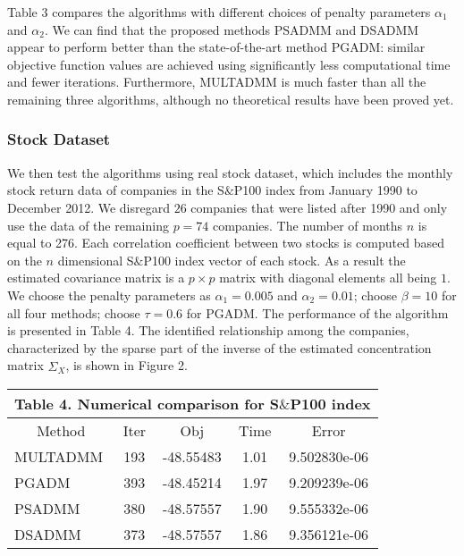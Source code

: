 \documentclass{mcom-l}
\theoremstyle{definition}
\theoremstyle{remark}
\numberwithin{equation}{section}
\begin{document}
Table 3 compares the algorithms with different choices of penalty parameters $\alpha_1$ and $\alpha_2$. We can find that the proposed methods PSADMM and DSADMM appear to perform better than the state-of-the-art method PGADM: similar objective function values are achieved using significantly less computational time and fewer iterations. Furthermore, MULTADMM is much faster than all the remaining three algorithms, although no theoretical results have been proved yet.

\subsubsection{Stock Dataset}

We then test the algorithms using real stock dataset, which includes the monthly stock return data of companies in the S$\&$P100 index from January 1990 to December 2012. We disregard $26$ companies that were listed after 1990 and only use the data of the remaining $p=74$ companies. The number of months $n$ is equal to 276. Each correlation coefficient between two stocks is computed based on the $n$ dimensional S$\&$P100 index vector of each stock. As a result the estimated covariance matrix is a $p\times p$ matrix with diagonal elements all being $1$. We choose the penalty parameters as $\alpha_1=0.005$ and $\alpha_2=0.01$; choose $\beta = 10$ for all four methods; choose $\tau = 0.6$ for PGADM. The performance of the algorithm is presented in Table 4. The identified relationship among the companies, characterized by the sparse part of the inverse of the estimated concentration matrix $\hat{\Sigma}_X$, is shown in Figure 2.

\begin{center}
{\scriptsize\vskip 0.1cm
\begin{tabular}{| l || c| c| c| c|}
\multicolumn{5}{c}{\small{Table 4. Numerical comparison for S$\&$P100 index}}\\
\hline
   \multicolumn{1}{|c||}{\hbox{Method}}&\hbox{Iter}&\hbox{Obj}&\hbox{Time}&\hbox{Error}\\
\hline
MULTADMM    &193    &-48.55483  &1.01   &9.502830e-06\\
\hline
PGADM        &393    &-48.45214  &1.97   &9.209239e-06\\
\hline
PSADMM      &380    &-48.57557  &1.90   &9.555332e-06\\
\hline
DSADMM      &373    &-48.57557  &1.86   &9.356121e-06\\
\hline
\end{tabular}
}
\end{center}
\end{document}
